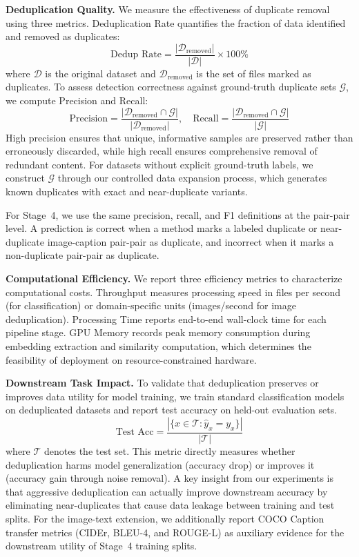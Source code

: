 \documentclass[conference]{IEEEtran}
\begin{document}
\textbf{Deduplication Quality.} We measure the effectiveness of duplicate removal using three metrics. Deduplication Rate quantifies the fraction of data identified and removed as duplicates:
\begin{equation}
\text{Dedup Rate} = \frac{|\mathcal{D}_{\text{removed}}|}{|\mathcal{D}|} \times 100\%
\end{equation}
where $\mathcal{D}$ is the original dataset and $\mathcal{D}_{\text{removed}}$ is the set of files marked as duplicates. To assess detection correctness against ground-truth duplicate sets $\mathcal{G}$, we compute Precision and Recall:
\begin{equation}
\text{Precision} = \frac{|\mathcal{D}_{\text{removed}} \cap \mathcal{G}|}{|\mathcal{D}_{\text{removed}}|}, \quad
\text{Recall} = \frac{|\mathcal{D}_{\text{removed}} \cap \mathcal{G}|}{|\mathcal{G}|}
\end{equation}
High precision ensures that unique, informative samples are preserved rather than erroneously discarded, while high recall ensures comprehensive removal of redundant content. For datasets without explicit ground-truth labels, we construct $\mathcal{G}$ through our controlled data expansion process, which generates known duplicates with exact and near-duplicate variants.

For Stage~4, we use the same precision, recall, and F1 definitions at the pair-pair level. A prediction is correct when a method marks a labeled duplicate or near-duplicate image-caption pair-pair as duplicate, and incorrect when it marks a non-duplicate pair-pair as duplicate.

\textbf{Computational Efficiency.} We report three efficiency metrics to characterize computational costs. Throughput measures processing speed in files per second (for classification) or domain-specific units (images/second for image deduplication). Processing Time reports end-to-end wall-clock time for each pipeline stage. GPU Memory records peak memory consumption during embedding extraction and similarity computation, which determines the feasibility of deployment on resource-constrained hardware.

\textbf{Downstream Task Impact.} To validate that deduplication preserves or improves data utility for model training, we train standard classification models on deduplicated datasets and report test accuracy on held-out evaluation sets.
\begin{equation}
\text{Test Acc} = \frac{|\{x \in \mathcal{T} : \hat{y}_x = y_x\}|}{|\mathcal{T}|}
\end{equation}
where $\mathcal{T}$ denotes the test set. This metric directly measures whether deduplication harms model generalization (accuracy drop) or improves it (accuracy gain through noise removal). A key insight from our experiments is that aggressive deduplication can actually improve downstream accuracy by eliminating near-duplicates that cause data leakage between training and test splits.
For the image-text extension, we additionally report COCO Caption transfer metrics (CIDEr, BLEU-4, and ROUGE-L) as auxiliary evidence for the downstream utility of Stage~4 training splits.
\end{document}
